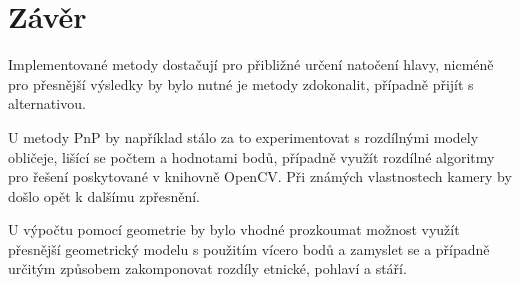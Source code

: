 \documentclass[12pt,a4paper,titlepage,final]{report}
\begin{document}
\section{Závěr}
Implementované metody dostačují pro přibližné určení natočení hlavy, nicméně pro přesnější výsledky by bylo nutné je metody zdokonalit, případně přijít s alternativou. 

U metody PnP by například stálo za to experimentovat s rozdílnými modely obličeje, lišící se počtem a hodnotami bodů, případně využít rozdílné algoritmy pro řešení poskytované v knihovně OpenCV. Při známých vlastnostech kamery by došlo opět k dalšímu zpřesnění. 

U výpočtu pomocí geometrie by bylo vhodné prozkoumat možnost využít přesnější geometrický modelu s použitím vícero bodů a zamyslet se a případně určitým způsobem zakomponovat rozdíly etnické, pohlaví a stáří.

\nocite{est_for_mobile}

\begin{flushleft}
  
\end{flushleft}
\end{document}
